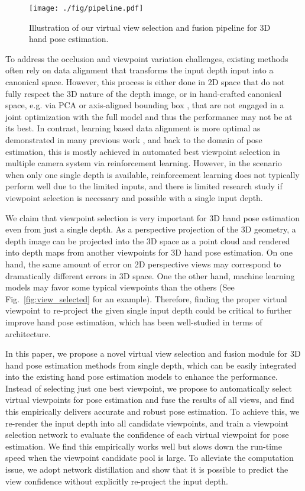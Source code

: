 \documentclass[letterpaper]{article} \usepackage{aaai22}  \usepackage{times}  \usepackage{helvet}  \usepackage{courier}  \usepackage[hyphens]{url}  \usepackage{graphicx} \urlstyle{rm} \def\UrlFont{\rm}  \usepackage{natbib}  \usepackage{caption} \DeclareCaptionStyle{ruled}{labelfont=normalfont,labelsep=colon,strut=off} \frenchspacing  \setlength{\pdfpagewidth}{8.5in}  \setlength{\pdfpageheight}{11in}  \usepackage{algorithm}
\begin{document}
\begin{figure*}[t]
\centering 
\texttt{[image: ./fig/pipeline.pdf]}
\caption{Illustration of our virtual view selection and fusion pipeline for 3D hand pose estimation.}
\label{fig:pipeline}
\end{figure*}

To address the occlusion and viewpoint variation challenges, existing methods often rely on data alignment that transforms the input depth input into a canonical space.
However, this process is either done in 2D space \cite{sun2015cascaded,ye2016spatial} that do not fully respect the 3D nature of the depth image, or in hand-crafted canonical space, e.g. via PCA \cite{ge2018_Point} or axis-aligned bounding box \cite{ge2016robust}, that are not engaged in a joint optimization with the full model and thus the performance may not be at its best.
In contrast, learning based data alignment is more optimal as demonstrated in many previous work \cite{jaderberg2015spatial}, and back to the domain of pose estimation, this is mostly achieved in automated best viewpoint selection in multiple camera system \cite{sminchisescu2019domes,gartner2020deep} via reinforcement learning.
However, in the scenario when only one single depth is available, reinforcement learning does not typically perform well due to the limited inputs, and there is limited research study if viewpoint selection is necessary and possible with a single input depth.

We claim that viewpoint selection is very important for 3D hand pose estimation even from just a single depth.
As a perspective projection of the 3D geometry, a depth image can be projected into the 3D space as a point cloud and rendered into depth maps from another viewpoints for 3D hand pose estimation.
On one hand, the same amount of error on 2D perspective views may correspond to dramatically different errors in 3D space.
One the other hand, machine learning models may favor some typical viewpoints than the others (See Fig.~\ref{fig:view_selected} for an example).
Therefore, finding the proper virtual viewpoint to re-project the given single input depth could be critical to further improve hand pose estimation, which has been well-studied in terms of architecture.

In this paper, we propose a novel virtual view selection and fusion module for 3D hand pose estimation methods from single depth, 
which can be easily integrated into the existing hand pose estimation models to enhance the performance.
Instead of selecting just one best viewpoint, we propose to automatically select virtual viewpoints for pose estimation and fuse the results of all views, and find this empirically delivers accurate and robust pose estimation.
To achieve this, we re-render the input depth into all candidate viewpoints, and train a viewpoint selection network to evaluate the confidence of each virtual viewpoint for pose estimation.
We find this empirically works well but slows down the run-time speed when the viewpoint candidate pool is large.
To alleviate the computation issue, we adopt network distillation and show that it is possible to predict the view confidence without explicitly re-project the input depth.
\end{document}
